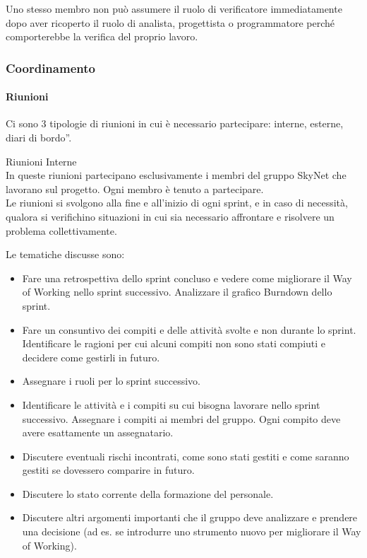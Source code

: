 \documentclass[12pt, a4paper]{article}
\begin{document}
Uno stesso membro non può assumere il ruolo di verificatore
immediatamente dopo aver ricoperto il ruolo di analista, progettista o
programmatore perché comporterebbe la verifica del proprio lavoro.

\subsubsection{Coordinamento}

\paragraph{Riunioni}

Ci sono 3 tipologie di riunioni in cui è necessario partecipare:
interne, esterne, diari di bordo''.

{Riunioni Interne}\\
In queste riunioni partecipano esclusivamente i membri del gruppo
SkyNet che lavorano sul progetto. Ogni membro è tenuto a partecipare.\\
Le riunioni si svolgono alla fine e all'inizio di ogni sprint, e in caso
di necessità, qualora si verifichino situazioni in cui sia necessario
affrontare e risolvere un problema collettivamente.

Le tematiche discusse sono:

\begin{itemize}
\item
  Fare una retrospettiva dello sprint concluso e vedere come migliorare
  il Way of Working nello sprint successivo. Analizzare il grafico
  Burndown dello sprint.
\item
  Fare un consuntivo dei compiti e delle attività svolte e non durante
  lo sprint. Identificare le ragioni per cui alcuni compiti non sono
  stati compiuti e decidere come gestirli in futuro.
\item
  Assegnare i ruoli per lo sprint successivo.
\item
  Identificare le attività e i compiti su cui bisogna lavorare nello
  sprint successivo. Assegnare i compiti ai membri del gruppo. Ogni
  compito deve avere esattamente un assegnatario.
\item
  Discutere eventuali rischi incontrati, come sono stati gestiti e come
  saranno gestiti se dovessero comparire in futuro.
\item
  Discutere lo stato corrente della formazione del personale.
\item
  Discutere altri argomenti importanti che il gruppo deve analizzare e
  prendere una decisione (ad es. se introdurre uno strumento nuovo per
  migliorare il Way of Working).
\end{itemize}
\end{document}
